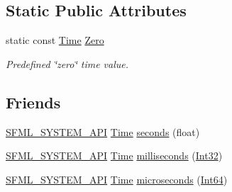 \subsection*{Static Public Attributes}
\begin{DoxyCompactItemize}
\item 
static const \hyperlink{classsf_1_1_time}{Time} \hyperlink{classsf_1_1_time_a8db127b632fa8da21550e7282af11fa0}{Zero}
\begin{DoxyCompactList}\small\item\em Predefined \char`\"{}zero\char`\"{} time value. \end{DoxyCompactList}\end{DoxyCompactItemize}
\subsection*{Friends}
\begin{DoxyCompactItemize}
\item 
\hyperlink{_system_2_export_8hpp_a6476c9e422606477a4c23d92b1d79a1f}{S\-F\-M\-L\-\_\-\-S\-Y\-S\-T\-E\-M\-\_\-\-A\-P\-I} \hyperlink{classsf_1_1_time}{Time} \hyperlink{classsf_1_1_time_abe757d058fd820b4c84232c1451c1efa}{seconds} (float)
\item 
\hyperlink{_system_2_export_8hpp_a6476c9e422606477a4c23d92b1d79a1f}{S\-F\-M\-L\-\_\-\-S\-Y\-S\-T\-E\-M\-\_\-\-A\-P\-I} \hyperlink{classsf_1_1_time}{Time} \hyperlink{classsf_1_1_time_a8dc1cb5f5fdde2ed2221d5af80cce853}{milliseconds} (\hyperlink{namespacesf_ac2dfd4952377a26dee4750e2e4a30a15}{Int32})
\item 
\hyperlink{_system_2_export_8hpp_a6476c9e422606477a4c23d92b1d79a1f}{S\-F\-M\-L\-\_\-\-S\-Y\-S\-T\-E\-M\-\_\-\-A\-P\-I} \hyperlink{classsf_1_1_time}{Time} \hyperlink{classsf_1_1_time_ab4f5b719ece75ebd11593f935fbe3bcb}{microseconds} (\hyperlink{namespacesf_a2840579fed3494d9f330baf7a5a19903}{Int64})
\end{DoxyCompactItemize}
